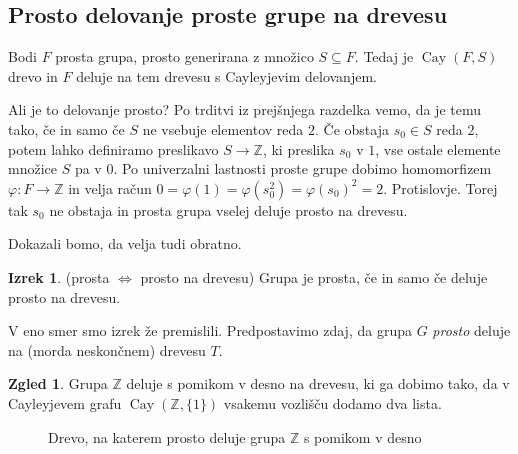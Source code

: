 \documentclass[11pt]{book}
\def\ZZ{\mathbb{Z}}
\DeclareMathOperator\Cay{Cay}
\def\vprasanje{\color{oranzna}}
\theoremstyle{definition}
\theoremstyle{zgled}
\newtheorem*{zgled}{Zgled}
\theoremstyle{odprtproblem}
\theoremstyle{domacanaloga}
\theoremstyle{izrek}
\newtheorem*{izrek}{Izrek}
\begin{document}
\subsection{Prosto delovanje proste grupe na drevesu}

Bodi $F$ prosta grupa, prosto generirana z množico $S \subseteq F$. Tedaj je $\Cay(F,S)$ drevo in $F$ deluje na tem drevesu s Cayleyjevim delovanjem. 

{\vprasanje Ali je to delovanje prosto?} Po trditvi iz prejšnjega razdelka vemo, da je temu tako, če in samo če $S$ ne vsebuje elementov reda $2$. Če obstaja $s_0 \in S$ reda $2$, potem lahko definiramo preslikavo $S \to \ZZ$, ki preslika $s_0$ v $1$, vse ostale elemente množice $S$ pa v $0$. Po univerzalni lastnosti proste grupe dobimo homomorfizem $\varphi \colon F \to \ZZ$ in velja račun $0 = \varphi(1) = \varphi(s_0^2) = \varphi(s_0)^2 = 2$. Protislovje. Torej tak $s_0$ ne obstaja in prosta grupa vselej deluje prosto na drevesu.

Dokazali bomo, da velja tudi obratno.

\begin{izrek}{\sc (prosta $\Leftrightarrow$ prosto na drevesu)}
Grupa je prosta, če in samo če deluje prosto na drevesu.
\end{izrek}

V eno smer smo izrek že premislili. Predpostavimo zdaj, da grupa $G$ {\em prosto} deluje na (morda neskončnem) drevesu $T$.

\begin{zgled}
Grupa $\ZZ$ deluje s pomikom v desno na drevesu, ki ga dobimo tako, da v Cayleyjevem grafu $\Cay(\ZZ, \{ 1 \})$ vsakemu vozlišču dodamo dva lista.
\end{zgled}

\begin{figure}[t]
\centering
{}
\caption{Drevo, na katerem prosto deluje grupa $\ZZ$ s pomikom v desno}
\end{figure}
\end{document}
